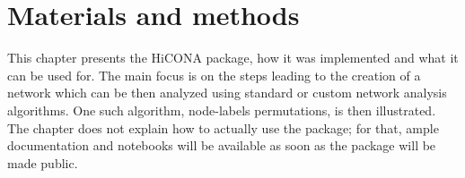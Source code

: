 \graphicspath{{chapters/04_materials_and_methods/images/}}
\chapter{Materials and methods}


This chapter presents the HiCONA package, how it was implemented and what it can be used for. The main focus is on the steps leading to the creation of a network which can be then analyzed using standard or custom network analysis algorithms. One such algorithm, node-labels permutations, is then illustrated. The chapter does not explain how to actually use the package; for that, ample documentation and notebooks will be available as soon as the package will be made public.

